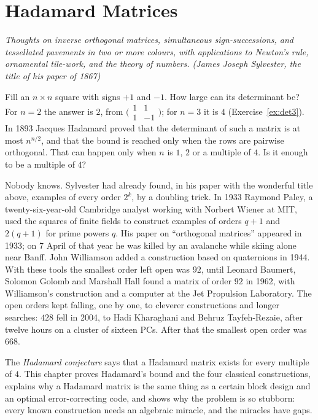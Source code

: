 \chapter{Hadamard Matrices}\label{ch:hadamard}

\begin{center}\itshape
Thoughts on inverse orthogonal matrices, simultaneous sign-successions, and tessellated pavements in two or more colours, with applications to
Newton's rule, ornamental tile-work, and the theory of numbers.
\upshape(James Joseph Sylvester, the title of his paper of 1867)
\end{center}

Fill an $n\times n$ square with signs $+1$ and $-1$. How large can its determinant be? For $n=2$ the answer is $2$, from
$\bigl(\begin{smallmatrix}1&1\\1&-1\end{smallmatrix}\bigr)$; for $n=3$ it is $4$ (Exercise~\ref{ex:det3}). In 1893 Jacques Hadamard proved that the
determinant of such a matrix is at most $n^{n/2}$, and that the bound is reached only when the rows are pairwise orthogonal. That can happen only when $n$
is $1$, $2$ or a multiple of $4$. Is it enough to be a multiple of $4$?

Nobody knows. Sylvester had already found, in his paper with the wonderful title above, examples of every order $2^k$, by a doubling trick. In 1933
Raymond Paley, a twenty-six-year-old Cambridge analyst working with Norbert Wiener at MIT, used the squares of finite fields to construct examples of
orders $q+1$ and $2(q+1)$ for prime powers $q$. His paper on ``orthogonal matrices'' appeared in 1933; on 7 April of that year he was killed by an
avalanche while skiing alone near Banff. John Williamson added a construction based on quaternions in 1944. With these tools the smallest order
left open was $92$, until Leonard Baumert, Solomon Golomb and Marshall Hall found a matrix of order $92$ in 1962, with Williamson's construction and
a computer at the Jet Propulsion Laboratory. The open orders kept falling, one by one, to cleverer constructions and longer searches: $428$ fell in
2004, to Hadi Kharaghani and Behruz Tayfeh-Rezaie, after twelve hours on a cluster of sixteen PCs. After that the smallest open order was $668$.

The \emph{Hadamard conjecture} says that a Hadamard matrix exists for every multiple of $4$. This chapter proves Hadamard's bound and the four classical
constructions, explains why a Hadamard matrix is the same thing as a certain block design and an optimal error-correcting code, and shows why the
problem is so stubborn: every known construction needs an algebraic miracle, and the miracles have gaps.

